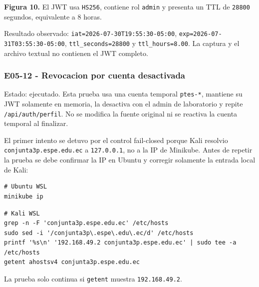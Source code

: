 \textbf{Figura 10.} El JWT usa \texttt{HS256}, contiene rol \texttt{admin} y presenta un TTL de \texttt{28800} segundos, equivalente a 8 horas.

Resultado observado: \texttt{iat=2026-07-30T19:55:30-05:00}, \texttt{exp=2026-07-31T03:55:30-05:00}, \texttt{ttl\_seconds=28800} y \texttt{ttl\_hours=8.00}. La captura y el archivo textual no contienen el JWT completo.

\subsubsection{E05-12 - Revocacion por cuenta desactivada}\label{e05-12---revocacion-por-cuenta-desactivada}

Estado: ejecutado. Esta prueba usa una cuenta temporal \texttt{ptes-*}, mantiene su JWT solamente en memoria, la desactiva con el admin de laboratorio y repite \texttt{/api/auth/perfil}. No se modifica la fuente original ni se reactiva la cuenta temporal al finalizar.

El primer intento se detuvo por el control fail-closed porque Kali resolvio \texttt{conjunta3p.espe.edu.ec} a \texttt{127.0.0.1}, no a la IP de Minikube. Antes de repetir la prueba se debe confirmar la IP en Ubuntu y corregir solamente la entrada local de Kali:

\begin{tcolorbox}[codebox]
\begin{Verbatim}[fontsize=\scriptsize,breaklines=true,breakanywhere=true]
# Ubuntu WSL
minikube ip
\end{Verbatim}
\end{tcolorbox}

\begin{tcolorbox}[codebox]
\begin{Verbatim}[fontsize=\scriptsize,breaklines=true,breakanywhere=true]
# Kali WSL
grep -n -F 'conjunta3p.espe.edu.ec' /etc/hosts
sudo sed -i '/conjunta3p\.espe\.edu\.ec/d' /etc/hosts
printf '%s\n' '192.168.49.2 conjunta3p.espe.edu.ec' | sudo tee -a /etc/hosts
getent ahostsv4 conjunta3p.espe.edu.ec
\end{Verbatim}
\end{tcolorbox}

La prueba solo continua si \texttt{getent} muestra \texttt{192.168.49.2}.

